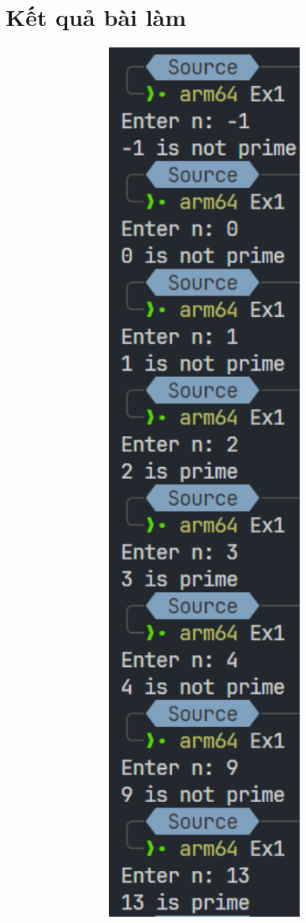 \documentclass[a4paper,12pt]{report}
\begin{document}
\section{Kết quả bài làm}
\begin{figure}[!ht]
	\centering
	\begin{subfigure}{0.28\textwidth}
		\centering
		\includegraphics[width=1\textwidth]{imgs/1.png}

\end{subfigure}
\end{figure}
\end{document}
